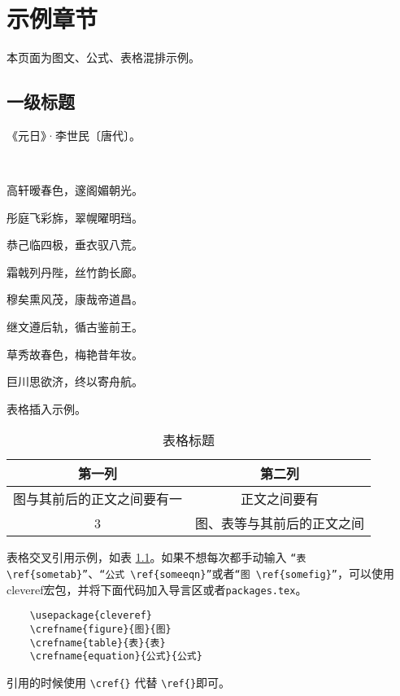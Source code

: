 \chapter{示例章节}

本页面为图文、公式、表格混排示例。

\section{一级标题}
\thispagestyle{fancy}
\begin{center}
《元日》·李世民〔唐代〕。

\ 

高轩暧春色，邃阁媚朝光。

彤庭飞彩旆，翠幌曜明珰。

恭己临四极，垂衣驭八荒。

霜戟列丹陛，丝竹韵长廊。

穆矣熏风茂，康哉帝道昌。

继文遵后轨，循古鉴前王。

草秀故春色，梅艳昔年妆。

巨川思欲济，终以寄舟航。
\end{center}

表格插入示例。
\begin{table}[!h]
    \centering
    \caption{表格标题}
    \label{tab:exp1}
    \tabfont %
    \begin{tabular}{cc}
        \toprule
        第一列                     & 第二列                     \\
        \midrule
        图与其前后的正文之间要有一 & 正文之间要有               \\
        3                          & 图、表等与其前后的正文之间 \\
        \bottomrule
    \end{tabular}
\end{table}

表格交叉引用示例，如表 \ref{tab:exp1}。如果不想每次都手动输入 \verb|“表 \ref{sometab}”|、\verb|“公式 \ref{someeqn}”|或者\verb|“图 \ref{somefig}”|，可以使用cleveref宏包，并将下面代码加入导言区或者\verb|packages.tex|。
\begin{verbatim}
    \usepackage{cleveref}
    \crefname{figure}{图}{图}
    \crefname{table}{表}{表}
    \crefname{equation}{公式}{公式}
\end{verbatim}

引用的时候使用 \verb|\cref{}| 代替 \verb|\ref{}|即可。



